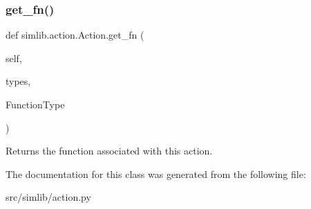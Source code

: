 \subsubsection{\texorpdfstring{get\+\_\+fn()}{get\_fn()}}
{\footnotesize\ttfamily def simlib.\+action.\+Action.\+get\+\_\+fn (\begin{DoxyParamCaption}\item[{}]{self,  }\item[{}]{types,  }\item[{}]{Function\+Type }\end{DoxyParamCaption})}

\begin{DoxyVerb}Returns the function associated with this action.
\end{DoxyVerb}
 

The documentation for this class was generated from the following file\+:\begin{DoxyCompactItemize}
\item 
src/simlib/action.\+py\end{DoxyCompactItemize}
